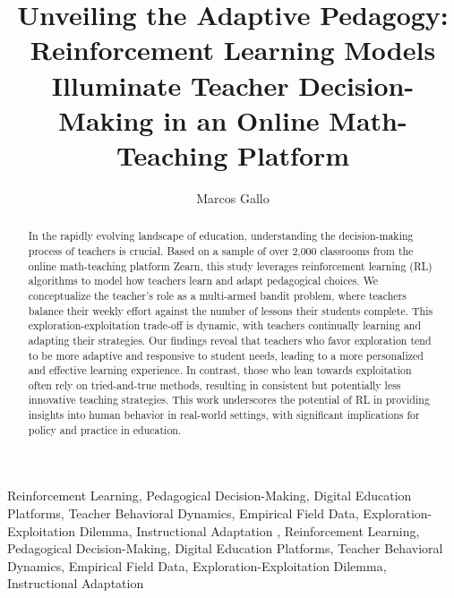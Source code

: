 \documentclass[
  number,
  preprint,
  3p,
  onecolumn]{elsarticle}
\begin{document}
\begin{frontmatter}
\title{Unveiling the Adaptive Pedagogy: Reinforcement Learning Models
Illuminate Teacher Decision-Making in an Online Math-Teaching Platform}
\author[]{Marcos Gallo%
%
}




        
\begin{abstract}
In the rapidly evolving landscape of education, understanding the
decision-making process of teachers is crucial. Based on a sample of
over 2,000 classrooms from the online math-teaching platform Zearn, this
study leverages reinforcement learning (RL) algorithms to model how
teachers learn and adapt pedagogical choices. We conceptualize the
teacher's role as a multi-armed bandit problem, where teachers balance
their weekly effort against the number of lessons their students
complete. This exploration-exploitation trade-off is dynamic, with
teachers continually learning and adapting their strategies. Our
findings reveal that teachers who favor exploration tend to be more
adaptive and responsive to student needs, leading to a more personalized
and effective learning experience. In contrast, those who lean towards
exploitation often rely on tried-and-true methods, resulting in
consistent but potentially less innovative teaching strategies. This
work underscores the potential of RL in providing insights into human
behavior in real-world settings, with significant implications for
policy and practice in education.
\end{abstract}





\begin{keyword}
    Reinforcement Learning, Pedagogical Decision-Making, Digital
Education Platforms, Teacher Behavioral Dynamics, Empirical Field Data,
Exploration-Exploitation Dilemma, Instructional Adaptation \sep 
    Reinforcement Learning, Pedagogical Decision-Making, Digital
Education Platforms, Teacher Behavioral Dynamics, Empirical Field Data,
Exploration-Exploitation Dilemma, Instructional Adaptation
\end{keyword}
\end{frontmatter}
    \ifdefined\Shaded\renewenvironment{Shaded}{\begin{tcolorbox}[boxrule=0pt, breakable, frame hidden, borderline west={3pt}{0pt}{shadecolor}, interior hidden, enhanced, sharp corners]}{\end{tcolorbox}}\fi
\end{document}
